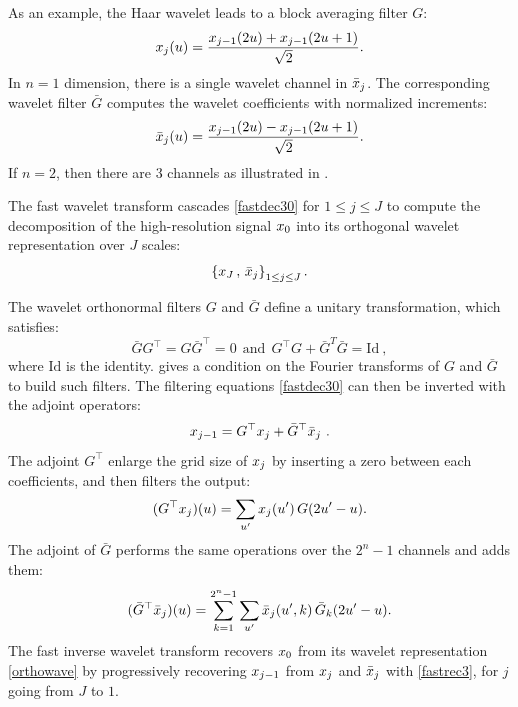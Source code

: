 \documentclass{article}
\begin{document}
As an example, the Haar wavelet leads to a block averaging filter $G$:
\[
x_j(u)= \frac{x_{j-1}(2u)+x_{j-1}(2u+1)}{\sqrt{2}}.
\]
In $n=1$ dimension, there is a single wavelet channel in $\bar x_j$. The corresponding wavelet filter $\bar G$ computes the wavelet coefficients with normalized increments:
\begin{equation}
    \label{Harwnsdf}
\bar x_j(u)= \frac{x_{j-1}(2u)-x_{j-1}(2u+1)}{\sqrt{2}}.
\end{equation}
If $n = 2$, then there are $3$ channels as illustrated in .


The fast wavelet transform cascades \eqref{fastdec30} for $1 \leq j \leq J$ 
to compute the decomposition of the high-resolution signal $x_0$ into its orthogonal wavelet representation
over $J$ scales:
\begin{equation}
\label{orthowave}
\left\{ x_J\, ,\, \bar x_j \right\}_{1 \leq j \leq J} .
\end{equation}

The wavelet orthonormal filters $G$ and $\bar G$ define
a unitary transformation, which satisfies:
\begin{equation}
  \label{consdsf}
\bar G G^\top = G \bar G^\top = 0~~\mbox{and}~~G^\top G + \bar G^T \bar G = \mathrm{Id}~,
\end{equation}
where $\mathrm{Id}$ is the identity. \cite{Mallat:89} gives a condition on the Fourier transforms of $G$ and $\bar G$ to build such filters.
The filtering equations \eqref{fastdec30}
can then be inverted with the adjoint operators:
\begin{equation}
  \label{fastrec3}
  x_{j-1} = G^\top x_j + \bar G^\top \bar x_j~.
\end{equation}
The adjoint $G^\top$ enlarge the grid size of $x_j$ by inserting a zero between each coefficients, and then filters the output:
\[
(G^\top x_j)(u) = \sum_{u'} x_j (u' )\, G (2u'-u) .
\]
The adjoint of $\bar G$ performs the same operations over the $2^n-1$ channels and adds them:
\[
(\bar G^\top \bar x_j )(u) = \sum_{k=1}^{2^n-1} \sum_{u'} \bar x_j (u',k )\, \bar G_k (2u'-u) .
\]
The fast inverse wavelet transform \cite{Mallat:89} recovers 
$x_0$ from its wavelet representation \eqref{orthowave} 
by progressively recovering $x_{j-1}$ from $x_j$ and $\bar x_j$
with \eqref{fastrec3}, for $j$ going from $J$ to $1$.
\end{document}
